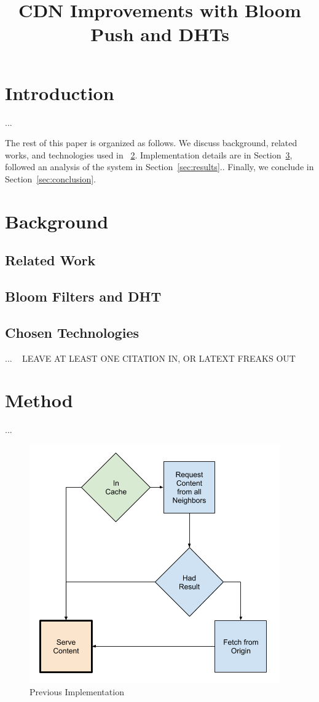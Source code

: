 \documentclass[conference]{IEEEtran}
\begin{document}
\title{CDN Improvements with Bloom Push and DHTs}

\author{
	\and
}

\maketitle
\thispagestyle{plain}
\pagestyle{plain}

\section{Introduction}\label{sec:intro}
...

The rest of this paper is organized as follows.  We discuss background, related works, and technologies used in ~\ref{sec:back}.  Implementation details are in Section~\ref{sec:method}, followed an analysis of the system in Section~\ref{sec:results}..  Finally, we conclude in Section~\ref{sec:conclusion}. 

\section{Background}\label{sec:back}
\subsection*{Related Work}
\subsection*{Bloom Filters and DHT}
\subsection*{Chosen Technologies}
... ~\cite{docker} LEAVE AT LEAST ONE CITATION IN, OR LATEXT FREAKS OUT

\section{Method}\label{sec:method}
...

\begin{figure}[!h]
		\centering
		\includegraphics[width=0.49\columnwidth]{figures/cache_logic_before.png}
	\caption{Previous Implementation}
\end{figure}
\end{document}
